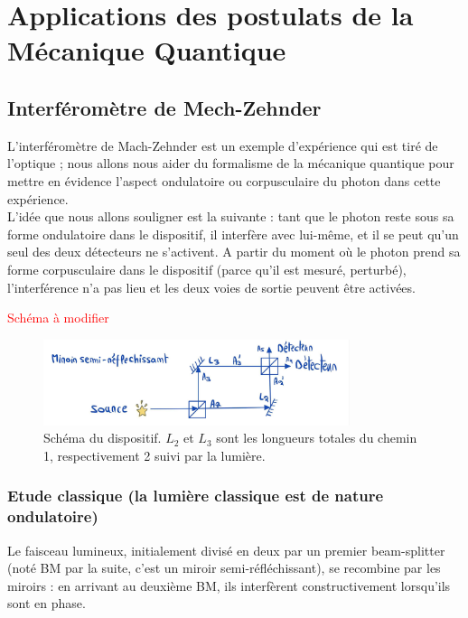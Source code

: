 \documentclass[../notesdecours.tex]{subfiles}
\begin{document}
\chapter{Applications des postulats de la Mécanique Quantique}

\section{Interféromètre de Mech-Zehnder}
L'interféromètre de Mach-Zehnder est un exemple d'expérience qui est tiré de l'optique ; nous allons nous aider du formalisme de la mécanique quantique pour mettre en évidence l'aspect ondulatoire ou corpusculaire du photon dans cette expérience. \\
L'idée que nous allons souligner est la suivante : tant que le photon reste sous sa forme ondulatoire dans le dispositif, il interfère avec lui-même, et il se peut qu'un seul des deux détecteurs ne s'activent. A partir du moment où le photon prend sa forme corpusculaire dans le dispositif (parce qu'il est mesuré, perturbé), l'interférence n'a pas lieu et les deux voies de sortie peuvent être activées. 

\textcolor{red}{Schéma à modifier}
\begin{center}
    \begin{figure}[h]
    \centering
    \includegraphics[width=0.80\textwidth]{Mach-Zehnder.png}
    \caption{Schéma du dispositif. $L_2$ et $L_3$ sont les longueurs totales du chemin 1, respectivement 2 suivi par la lumière. }
    \label{Mach-Zehnder}
    \end{figure}
\end{center}

\subsection{Etude classique (la lumière classique est de nature ondulatoire)}

Le faisceau lumineux, initialement divisé en deux par un premier beam-splitter (noté BM par la suite, c'est un miroir semi-réfléchissant), se recombine par les miroirs : en arrivant au deuxième BM, ils interfèrent constructivement lorsqu'ils sont en phase. \\
\end{document}
